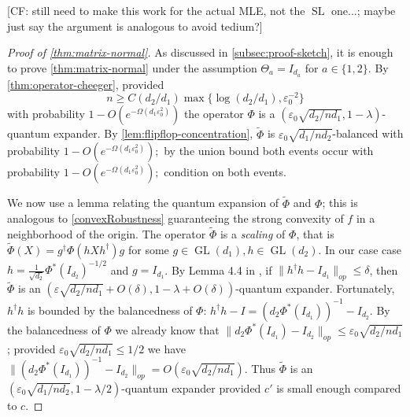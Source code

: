 \documentclass[aos]{imsart}
\theoremstyle{definition}
\numberwithin{equation}{section}
\DeclareMathOperator{\GL}{GL}
\newcommand{\eps}{\varepsilon}
\newcommand{\SL}{\operatorname{SL}}
\newcommand{\CF}[1]{{\color{purple}[CF: #1]}}
\begin{document}
\CF{still need to make this work for the actual MLE, not the $\SL$ one...; maybe just say the argument is analogous to avoid tedium?}
\begin{proof}[Proof of \cref{thm:matrix-normal}] As discussed in \cref{subsec:proof-sketch}, it is enough to prove \cref{thm:matrix-normal} under the assumption $\Theta_a = I_{d_a}$ for $a \in \{1,2\}$. By \cref{thm:operator-cheeger}, provided 
$$n \geq C (d_2/d_1) \max\{\log (d_2/d_1),  \eps_0^{-2}\} $$
 with probability $1 - O(e^{ - \Omega( d_1 \eps_0^2)})$ the operator $\Phi$ is a $(\eps_0  \sqrt{{d_2}/{n d_1}},1-\lambda)$-quantum expander. By \cref{lem:flipflop-concentration}, $\tilde{\Phi}$ is $\eps_0 \sqrt{{d_1}/{n d_2}}$-balanced with probability $1 - O(e^{ - \Omega( d_1 \eps_0^2)});$ by the union bound both events occur with probability $1 - O(e^{ - \Omega( d_1 \eps_0^2)});$ condition on both events.
 
We now use a lemma relating the quantum expansion of $\tilde{\Phi}$ and $\Phi$; this is analogous to \cref{convexRobustness} guaranteeing the strong convexity of $f$ in a neighborhood of the origin. The operator $\tilde{\Phi}$ is a \emph{scaling} of $\Phi$, that is $\tilde{\Phi}(X) = g^\dagger \Phi( h X h^\dagger) g$ for some $g \in \GL(d_1), h \in \GL(d_2)$. In our case case $h = \frac{1}{\sqrt{d_2}}\Phi^*(I_{d_2})^{-1/2}$ and $g = I_{d_1}$. By Lemma 4.4 in \cite{FM20}, if $\|h^\dagger h - I_{d_1}\|_{op} \leq \delta$,  then $\tilde{\Phi}$ is an $(\eps \sqrt{d_2/n d_1} + O(\delta), 1 - \lambda + O(\delta))$-quantum expander. Fortunately, $h^\dagger h$ is bounded by the balancedness of $\Phi$: $h^\dagger h - I = (d_2 \Phi^*(I_{d_1}))^{-1} - I_{d_2}$. By the balancedness of $\Phi$ we already know that $\|d_2 \Phi^*(I_{d_1}) - I_{d_2}\|_{op} \leq \eps_0 \sqrt{d_2/n d_1}$; provided $\eps_0 \sqrt{d_2/nd_1} \leq 1/2$ we have $\|(d_2 \Phi^*(I_{d_1}))^{-1} - I_{d_2}\|_{op} = O( \eps_0 \sqrt{d_2/n d_1})$. Thus $\tilde{\Phi}$ is an $(\eps_0 \sqrt{d_1 / n d_2}, 1 - \lambda/2)$-quantum expander provided $c'$ is small enough compared to $c$.
 

\end{proof}
\end{document}
